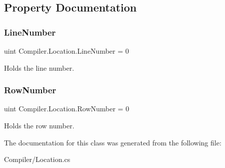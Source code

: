 \subsection{Property Documentation}
\mbox{\label{class_compiler_1_1_location_a71feb3bfd70af6096dc48451765ba284}} 
\subsubsection{\texorpdfstring{Line\+Number}{LineNumber}}
{\footnotesize\ttfamily uint Compiler.\+Location.\+Line\+Number = 0\hspace{0.3cm}{\ttfamily [get]}}

Holds the line number. \mbox{\label{class_compiler_1_1_location_a766213e18168dcb22d657bee4f047ed9}} 
\subsubsection{\texorpdfstring{Row\+Number}{RowNumber}}
{\footnotesize\ttfamily uint Compiler.\+Location.\+Row\+Number = 0\hspace{0.3cm}{\ttfamily [get]}}

Holds the row number. 

The documentation for this class was generated from the following file\+:\begin{DoxyCompactItemize}
\item 
Compiler/Location.\+cs\end{DoxyCompactItemize}
